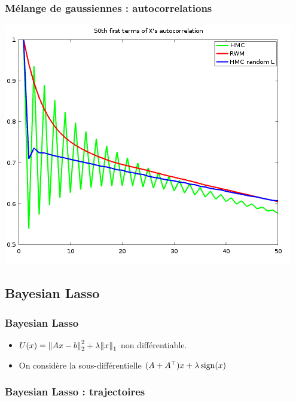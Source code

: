 \documentclass[10pt]{beamer}
\begin{document}
\begin{frame}
  \frametitle{Mélange de gaussiennes : autocorrelations}
\begin{center}
      \includegraphics[width=.8\textwidth]{figs/gm_autocor.png}
  \end{center}  
\end{frame}

\subsection{Bayesian Lasso}
\begin{frame}
  \frametitle{Bayesian Lasso}
\begin{itemize}
\item $U(x) = { \left\| Ax - b \right\|}_2^2 + \lambda { \left\| x \right\|}_1$ non différentiable.
\item On considère la sous-différentielle $(A + A^\top) x + \lambda \operatorname{sign}(x)$ 
\end{itemize}
\end{frame}
\begin{frame}
  \frametitle{Bayesian Lasso : trajectoires}
\begin{center}
  \end{center}  
\end{frame}
\end{document}
